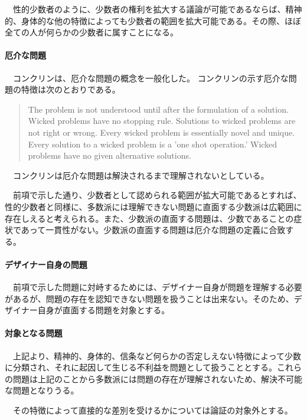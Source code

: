 \documentclass{jsarticle}
\begin{document}
　性的少数者のように、少数者の権利を拡大する議論が可能であるならば、精神的、身体的な他の特徴によっても少数者の範囲を拡大可能である。その際、ほぼ全ての人が何らかの少数者に属すことになる。

\paragraph*{厄介な問題}

　コンクリンは、厄介な問題の概念を一般化した\cite{Conklin}。 コンクリンの示す厄介な問題の特徴は次のとおりである。
\begin{quotation}

The problem is not understood until after the formulation of a solution.
Wicked problems have no stopping rule.
Solutions to wicked problems are not right or wrong.
Every wicked problem is essentially novel and unique.
Every solution to a wicked problem is a 'one shot operation.'
Wicked problems have no given alternative solutions.

\end{quotation}
　コンクリンは厄介な問題は解決されるまで理解されないとしている。

　前項で示した通り、少数者として認められる範囲が拡大可能であるとすれば、性的少数者と同様に、多数派には理解できない問題に直面する少数派は広範囲に存在しえると考えられる。また、少数派の直面する問題は、少数であることの症状であって一貫性がない。少数派の直面する問題は厄介な問題の定義に合致する。

\paragraph*{デザイナー自身の問題}

　前項で示した問題に対峙するためには、デザイナー自身が問題を理解する必要があるが、問題の存在を認知できない問題を扱うことは出来ない。そのため、デザイナー自身が直面する問題を対象とする。

\paragraph*{対象となる問題}

　上記より、精神的、身体的、信条など何らかの否定しえない特徴によって少数に分類され、それに起因して生じる不利益を問題として扱うこととする。これらの問題は上記のことから多数派には問題の存在が理解されないため、解決不可能な問題となりうる。

　その特徴によって直接的な差別を受けるかについては論証の対象外とする。
　
\end{document}
